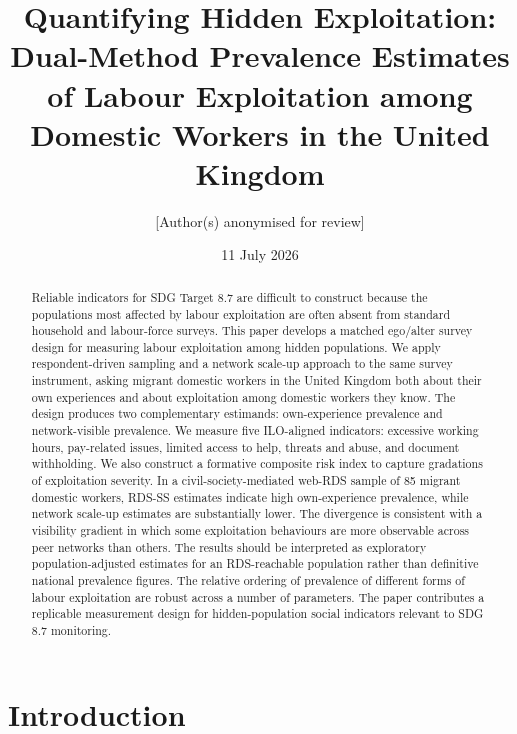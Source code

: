 \documentclass[
  12pt,
  letterpaper,
  DIV=11,
  numbers=noendperiod]{scrartcl}
\title{Quantifying Hidden Exploitation: Dual-Method Prevalence Estimates
of Labour Exploitation among Domestic Workers in the United Kingdom}
\author{{[}Author(s) anonymised for review{]}}
\date{11 July 2026}
\begin{document}
\maketitle
\begin{abstract}
Reliable indicators for SDG Target 8.7 are difficult to construct
because the populations most affected by labour exploitation are often
absent from standard household and labour-force surveys. This paper
develops a matched ego/alter survey design for measuring labour
exploitation among hidden populations. We apply respondent-driven
sampling and a network scale-up approach to the same survey instrument,
asking migrant domestic workers in the United Kingdom both about their
own experiences and about exploitation among domestic workers they know.
The design produces two complementary estimands: own-experience
prevalence and network-visible prevalence. We measure five ILO-aligned
indicators: excessive working hours, pay-related issues, limited access
to help, threats and abuse, and document withholding. We also construct
a formative composite risk index to capture gradations of exploitation
severity. In a civil-society-mediated web-RDS sample of 85 migrant
domestic workers, RDS-SS estimates indicate high own-experience
prevalence, while network scale-up estimates are substantially lower.
The divergence is consistent with a visibility gradient in which some
exploitation behaviours are more observable across peer networks than
others. The results should be interpreted as exploratory
population-adjusted estimates for an RDS-reachable population rather
than definitive national prevalence figures. The relative ordering of
prevalence of different forms of labour exploitation are robust across a
number of parameters. The paper contributes a replicable measurement
design for hidden-population social indicators relevant to SDG 8.7
monitoring.
\end{abstract}


\section{Introduction}\label{sec-intro}
\end{document}
